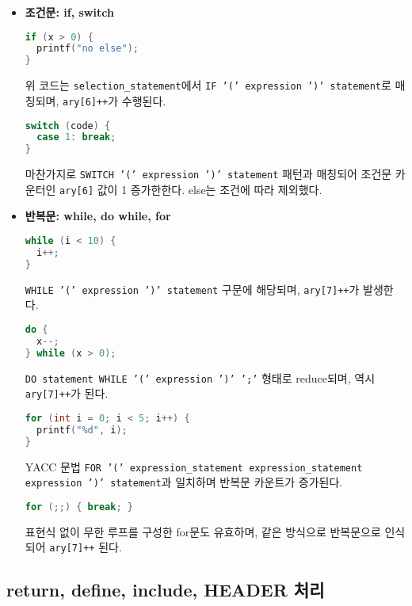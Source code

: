\documentclass{article}
\begin{document}
\begin{itemize}
  \item \textbf{조건문: if, switch}

  \begin{lstlisting}[language=C]
if (x > 0) {
  printf("no else");
}
  \end{lstlisting}
  위 코드는 \texttt{selection\_statement}에서 \texttt{IF '(' expression ')' statement}로 매칭되며, \texttt{ary[6]++}가 수행된다.

  \begin{lstlisting}[language=C]
switch (code) {
  case 1: break;
}
  \end{lstlisting}
  마찬가지로 \texttt{SWITCH '(' expression ')' statement} 패턴과 매칭되어 조건문 카운터인 \texttt{ary[6]} 값이 1 증가한한다.
  else는 조건에 따라 제외했다.

  \item \textbf{반복문: while, do while, for}

  \begin{lstlisting}[language=C]
while (i < 10) {
  i++;
}
  \end{lstlisting}
  \texttt{WHILE '(' expression ')' statement} 구문에 해당되며, \texttt{ary[7]++}가 발생한다.

  \begin{lstlisting}[language=C]
do {
  x--;
} while (x > 0);
  \end{lstlisting}
  \texttt{DO statement WHILE '(' expression ')' ';'} 형태로 reduce되며, 역시 \texttt{ary[7]++}가 된다.

  \begin{lstlisting}[language=C]
for (int i = 0; i < 5; i++) {
  printf("%d", i);
}
  \end{lstlisting}
  YACC 문법 \texttt{FOR '(' expression\_statement expression\_statement expression ')' statement}과 일치하며 반복문 카운트가 증가된다.

  \begin{lstlisting}[language=C]
for (;;) { break; }
  \end{lstlisting}
  표현식 없이 무한 루프를 구성한 for문도 유효하며, 같은 방식으로 반복문으로 인식되어 \texttt{ary[7]++} 된다.
\end{itemize}

\subsection{return, define, include, HEADER 처리}
\end{document}
